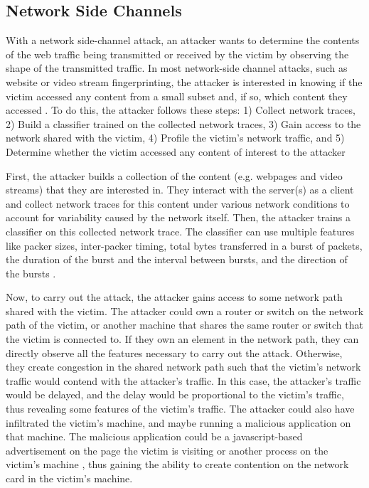 \subsection{Network Side Channels}
\label{subsec:netshaper-background-network-side-channels}

With a network side-channel attack, an attacker wants to determine the contents of the web traffic being transmitted or received by the victim by observing the shape of the transmitted traffic.
In most network-side channel attacks, such as website or video stream fingerprinting, the attacker is interested in knowing if the victim accessed any content from a small subset and, if so, which content they accessed \cite{bhat2019varcnn, dyer2012peek, hayes2016kfp, sirinam2018df, schuster2017beautyburst}.
To do this, the attacker follows these steps: 
1) Collect network traces,
2) Build a classifier trained on the collected network traces,
3) Gain access to the network shared with the victim,
4) Profile the victim's network traffic, and
5) Determine whether the victim accessed any content of interest to the attacker

First, the attacker builds a collection of the content (e.g. webpages and video streams) that they are interested in. 
They interact with the server(s) as a client and collect network traces for this content under various network conditions to account for variability caused by the network itself. 
Then, the attacker trains a classifier on this collected network trace.
The classifier can use multiple features like packer sizes, inter-packer timing, total bytes transferred in a burst of packets, the duration of the burst and the interval between bursts, and the direction of the bursts \cite{schuster2017beautyburst}.

Now, to carry out the attack, the attacker gains access to some network path shared with the victim.
The attacker could own a router or switch on the network path of the victim, or another machine that shares the same router or switch that the victim is connected to.
If they own an element in the network path, they can directly observe all the features necessary to carry out the attack. 
Otherwise, they create congestion in the shared network path such that the victim's network traffic would contend with the attacker's traffic.
In this case, the attacker's traffic would be delayed, and the delay would be proportional to the victim's traffic, thus revealing some features of the victim's traffic.
The attacker could also have infiltrated the victim's machine, and maybe running a malicious application on that machine.
The malicious application could be a javascript-based advertisement on the page the victim is visiting or another process on the victim's machine \cite{schuster2017beautyburst}, thus gaining the ability to create contention on the network card in the victim's machine. 


